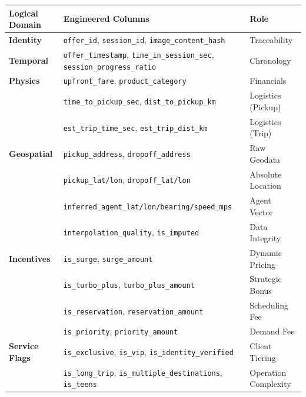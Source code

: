 \begin{table}[H]
    \centering
    \scriptsize
    \begin{tabularx}{\textwidth}{l p{7.5cm} l}
        \toprule
        \textbf{Logical Domain} & \textbf{Engineered Columns} & \textbf{Role} \\
        \midrule
        \textbf{Identity} & \texttt{offer\_id}, \texttt{session\_id}, \texttt{image\_content\_hash} & Traceability \\
        \midrule
        \textbf{Temporal} & \texttt{offer\_timestamp}, \texttt{time\_in\_session\_sec}, \texttt{session\_progress\_ratio} & Chronology \\
        \midrule
        \textbf{Physics} & \texttt{upfront\_fare}, \texttt{product\_category} & Financials \\
                         & \texttt{time\_to\_pickup\_sec}, \texttt{dist\_to\_pickup\_km} & Logistics (Pickup) \\
                         & \texttt{est\_trip\_time\_sec}, \texttt{est\_trip\_dist\_km} & Logistics (Trip) \\
        \midrule
        \textbf{Geospatial} & \texttt{pickup\_address}, \texttt{dropoff\_address} & Raw Geodata \\
                            & \texttt{pickup\_lat/lon}, \texttt{dropoff\_lat/lon} & Absolute Location \\
                            & \texttt{inferred\_agent\_lat/lon/bearing/speed\_mps} & Agent Vector \\
                            & \texttt{interpolation\_quality}, \texttt{is\_imputed} & Data Integrity \\
        \midrule
        \textbf{Incentives} & \texttt{is\_surge}, \texttt{surge\_amount} & Dynamic Pricing \\
                            & \texttt{is\_turbo\_plus}, \texttt{turbo\_plus\_amount} & Strategic Bonus \\
                            & \texttt{is\_reservation}, \texttt{reservation\_amount} & Scheduling Fee \\
                            & \texttt{is\_priority}, \texttt{priority\_amount} & Demand Fee \\
        \midrule
        \textbf{Service Flags} & \texttt{is\_exclusive}, \texttt{is\_vip}, \texttt{is\_identity\_verified} & Client Tiering \\
                               & \texttt{is\_long\_trip}, \texttt{is\_multiple\_destinations}, \texttt{is\_teens} & Operation Complexity \\

\end{tabularx}
\end{table}
